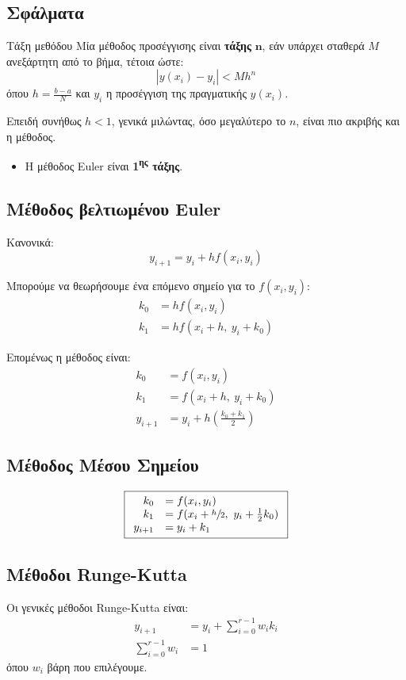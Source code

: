 \documentclass[11pt,a4paper,notitlepage,fleqn,final]{article}
\begin{document}
\subsection{Σφάλματα}
\begin{defn}{Τάξη μεθόδου}{}
	Μία μέθοδος προσέγγισης είναι \textbf{τάξης} \( \mathbf n \),
	εάν υπάρχει σταθερά \( M \) ανεξάρτητη από το βήμα, τέτοια ώστε:
	\[
	\left|y(x_i)-y_i\right| < Mh^n
	\]
	όπου \( h = \frac{b-a}{N} \) και \( y_i \) η προσέγγιση της
	πραγματικής \( y(x_i) \).
\end{defn}

Επειδή συνήθως \( h<1 \), γενικά μιλώντας, όσο μεγαλύτερο το \( n \),
είναι πιο ακριβής και η μέθοδος.

\begin{itemize}
	\item Η μέθοδος Euler είναι \textbf{1\textsuperscript{ης} τάξης}.
\end{itemize}

\subsection{Μέθοδος βελτιωμένου Euler}
Κανονικά:
\[
y_{i+1} = y_i + hf(x_i,y_i)
\]

Μπορούμε να θεωρήσουμε ένα επόμενο σημείο για το \( f(x_i,y_i) \):
\begin{align*}
	k_0 &= hf(x_i,y_i) \\
	k_1 &= hf(x_i+h,\ y_i+k_0)
\end{align*}

Επομένως η μέθοδος είναι:
\[
\boxed{\begin{array}{rl}
	k_0 &= f(x_i,y_i) \\
	k_1 &= f(x_i+h,\ y_i+k_0) \\
	y_{i+1} &= y_i + h \left(\frac{k_0+k_1}{2}\right)
	\end{array}}
\]

\subsection{Μέθοδος Μέσου Σημείου}
\[
\boxed{\begin{array}{rl}
	k_0 &= f(x_i,y_i) \\
	k_1 &= f(x_i+\sfrac{h}{2} ,\ y_i+\frac{1}{2}k_0) \\
	y_{i+1} &= y_i + k_1
	\end{array}}
\]

\subsection{Μέθοδοι Runge-Kutta}
Οι γενικές μέθοδοι Runge-Kutta είναι:
\begin{align*}
	y_{i+1} &= y_i +\sum_{i=0}^{r-1}w_ik_i \\
	\sum_{i=0}^{r-1} w_i &= 1
\end{align*}
όπου \( w_i \) βάρη που επιλέγουμε.
\end{document}
